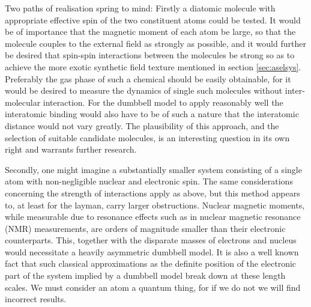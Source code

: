 \documentclass[main.tex]{subfiles}
\begin{document}
Two paths of realisation spring to mind: Firstly a diatomic molecule with appropriate effective
spin of the two constituent atoms could be tested. It would be of importance that the
magnetic moment of each atom be large, so that the molecule couples to the external
field as strongly as possible, and it would further be desired that spin-spin interactions
between the molecules be strong so as to achieve the more exotic synthetic field texture
mentioned in section \ref{sec:aselsys}. Preferably the gas phase of such a chemical should
be easily obtainable, for it would be desired to measure the dynamics of single such
molecules without inter-molecular interaction. For the dumbbell model to apply reasonably
well the interatomic binding would also have to be of such a nature that the interatomic
distance would not vary greatly. The plausibility of this approach, and the selection of
suitable candidate molecules, is an interesting question in its own right and warrants
further research.

Secondly, one might imagine a substantially smaller system consisting of a single atom with
non-negligible nuclear and electronic spin. The same considerations concerning the strength
of interactions apply as above, but this method appears to, at least for the layman, carry
larger obstructions. Nuclear magnetic moments, while measurable due to resonance effects such as in
nuclear magnetic resonance (NMR) measurements, are orders of magnitude smaller than their
electronic counterparts\cite{krane}. This, together with the disparate masses of electrons
and nucleus would necessitate a heavily asymmetric dumbbell model. It is also a well known
fact that such classical approximations as the definite position of the electronic part of
the system implied by a dumbbell model break down at these length scales. We must consider
an atom a quantum thing, for if we do not we will find incorrect results.
\end{document}
